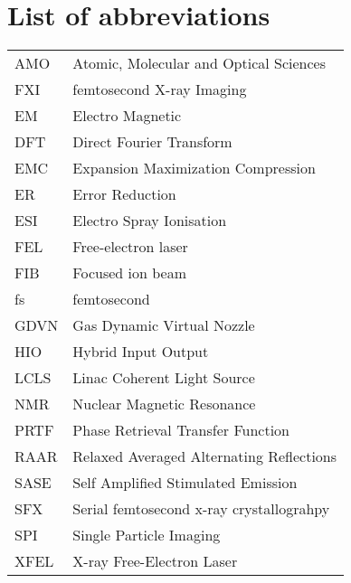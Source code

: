 \newenvironment{abbreviations}{
  \begin{tabular}{p{1.5cm}l}
}{
  \end{tabular}
}
\newcommand{\abb}[2]{#1 & #2 \\}

\chapter*{List of abbreviations}

\begin{abbreviations}
  \abb{AMO}{Atomic, Molecular and Optical Sciences}
  \abb{FXI}{femtosecond X-ray Imaging}
  \abb{EM}{Electro Magnetic} %
  \abb{DFT}{Direct Fourier Transform}  
  \abb{EMC}{Expansion Maximization Compression}
  \abb{ER}{Error Reduction}
  \abb{ESI}{Electro Spray Ionisation}
  \abb{FEL}{Free-electron laser}
  \abb{FIB}{Focused ion beam}
  \abb{fs}{femtosecond}
  \abb{GDVN}{Gas Dynamic Virtual Nozzle}
  \abb{HIO}{Hybrid Input Output}
  \abb{LCLS}{Linac Coherent Light Source}
  \abb{NMR}{Nuclear Magnetic Resonance}
  \abb{PRTF}{Phase Retrieval Transfer Function}
  \abb{RAAR}{Relaxed Averaged Alternating Reflections}
  \abb{SASE}{Self Amplified Stimulated Emission}
  \abb{SFX}{Serial femtosecond x-ray crystallograhpy}
  \abb{SPI}{Single Particle Imaging}
  \abb{XFEL}{X-ray Free-Electron Laser}
\end{abbreviations}

